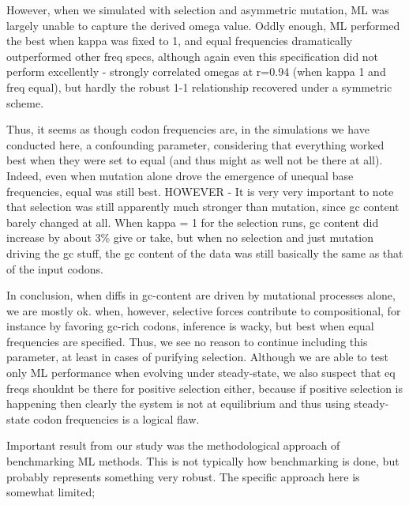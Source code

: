 \documentclass[11pt]{article}
\begin{document}
However, when we simulated with selection and asymmetric mutation, ML was largely unable to capture the derived omega value. Oddly enough, ML performed the best when kappa was fixed to 1, and equal frequencies dramatically outperformed other freq specs, although again even this specification did not perform excellently - strongly correlated omegas at r=0.94 (when kappa 1 and freq equal), but hardly the robust 1-1 relationship recovered under a symmetric scheme.

Thus, it seems as though codon frequencies are, in the simulations we have conducted here, a confounding parameter, considering that everything worked best when they were set to equal (and thus might as well not be there at all). Indeed, even when mutation alone drove the emergence of unequal base frequencies, equal was still best.
HOWEVER - It is very very important to note that selection was still apparently much stronger than mutation, since gc content barely changed at all. When kappa = 1 for the selection runs, gc content did increase by about 3\% give or take, but when no selection and just mutation driving the gc stuff, the gc content of the data was still basically the same as that of the input codons.

In conclusion, when diffs in gc-content are driven by mutational processes alone, we are mostly ok. when, however, selective forces contribute to compositional, for instance by favoring gc-rich codons, inference is wacky, but best when equal frequencies are specified. Thus, we see no reason to continue including this parameter, at least in cases of purifying selection. Although we are able to test only ML performance when evolving under steady-state, we also suspect that eq freqs shouldnt be there for positive selection either, because if positive selection is happening then clearly the system is not at equilibrium and thus using steady-state codon frequencies is a logical flaw.

Important result from our study was the methodological approach of benchmarking ML methods. This is not typically how benchmarking is done, but probably represents something very robust. The specific approach here is somewhat limited; 



\end{document}
